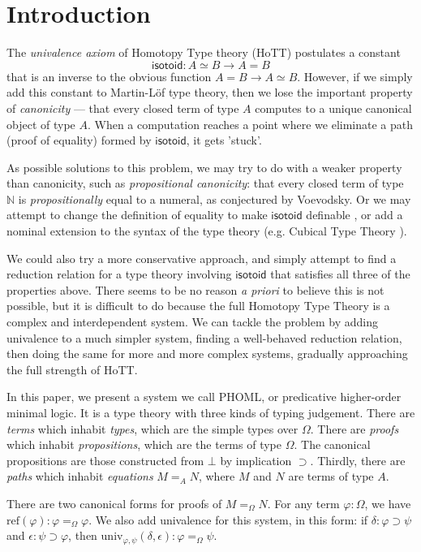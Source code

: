 \documentclass[a4paper,UKenglish]{lipics-v2016}
\newcommand*{\isotoid}{\ensuremath{\mathsf{isotoid}}}
\newcommand*{\reff}[1]{\ensuremath{\mathrm{ref} \left( {#1} \right)}}
\newcommand*{\univ}[4]{\ensuremath{\mathrm{univ}_{{#1}, {#2}} \left({#3} , {#4} \right)}}
\theoremstyle{plain}
\theoremstyle{definition}
\begin{document}
\section{Introduction}


The \emph{univalence axiom} of Homotopy Type theory (HoTT) \cite{hottbook} postulates a
constant
$$ \isotoid : A \simeq B \rightarrow A = B $$
that is an inverse to the obvious function $A = B \rightarrow A \simeq B$.  However, if we simply add this constant to Martin-L\"{o}f type theory, then
we lose the important property of \emph{canonicity} --- that every closed term of type $A$ computes to a unique canonical object of type $A$.  When a computation reaches a point
where we eliminate a path (proof of equality) formed by $\isotoid$, it gets 'stuck'.

As possible solutions to this problem, we may try to do with a weaker property than canonicity, such as \emph{propositional canonicity}:
that every closed term of type $\mathbb{N}$ is \emph{propositionally} equal to a numeral, as conjectured by Voevodsky.  Or we may attempt to change the definition of equality to make $\isotoid$ definable \cite{Polonsky14a}, or add a nominal extension to the syntax of the type theory (e.g. Cubical Type Theory \cite{cchm:cubical}).

We could also try a more conservative approach, and simply attempt to find a reduction relation for a type theory involving $\isotoid$ that satisfies
all three of the properties above.  There seems to be no reason \emph{a priori} to believe this is not possible, but it is difficult to do because
the full Homotopy Type Theory is a complex and interdependent system.  We can tackle the problem by adding univalence to a much simpler system, finding
a well-behaved reduction relation, then doing the same for more and more complex systems, gradually approaching the full strength of HoTT.

In this paper, we present a system we call PHOML, or predicative higher-order minimal logic.  It is a type theory with three kinds of typing judgement.  There are \emph{terms} which inhabit \emph{types}, which are the simple types over $\Omega$.  There are \emph{proofs} which inhabit \emph{propositions}, which are the terms of type $\Omega$.  The canonical propositions are those constructed from $\bot$ by implication $\supset$.  Thirdly, there are \emph{paths} which inhabit \emph{equations} $M =_A N$, where $M$ and $N$ are terms of type $A$.

There are two canonical forms for proofs of $M =_\Omega N$.  For any term $\varphi : \Omega$, we have $\reff{\varphi} : \varphi =_\Omega \varphi$.  We also add univalence for this system, in this form:
if $\delta : \varphi \supset \psi$ and $\epsilon : \psi \supset\varphi$, then $\univ{\varphi}{\psi}{\delta}{\epsilon} : \varphi =_\Omega \psi$.  
\end{document}
